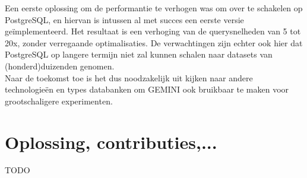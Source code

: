 Een eerste oplossing om de performantie te verhogen was om over te schakelen op PostgreSQL, en hiervan is intussen al met succes een eerste versie ge\"implementeerd. Het resultaat is een verhoging van de querysnelheden van 5 tot 20x, zonder verregaande optimalisaties. De verwachtingen zijn echter ook hier dat PostgreSQL op langere termijn niet zal kunnen schalen naar datasets van (honderd)duizenden genomen.\\
Naar de toekomst toe is het dus noodzakelijk uit kijken naar andere technologie\"en en types databanken om GEMINI ook bruikbaar te maken voor grootschaligere experimenten.

\section{Oplossing, contributies,...}

{\color{red} TODO}



